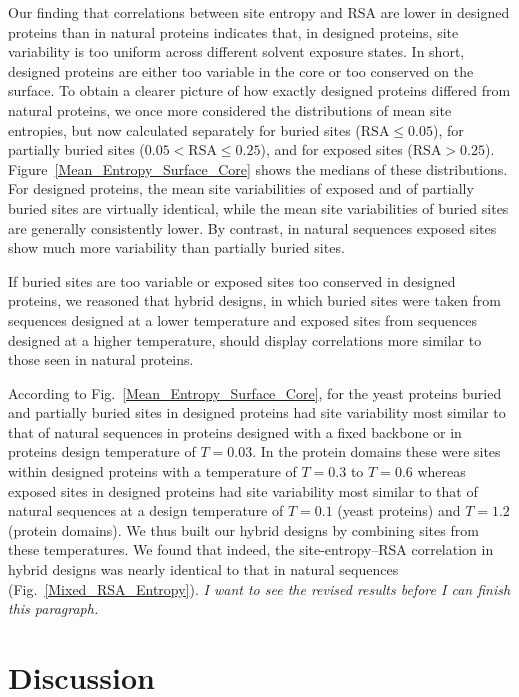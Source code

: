 \documentclass[12pt]{article}
\begin{document}
Our finding that correlations between site entropy and RSA are lower in designed proteins than in natural proteins indicates that, in designed proteins, site variability is too uniform across different solvent exposure states. In short, designed proteins are either too variable in the core or too conserved on the surface. To obtain a clearer picture of how exactly designed proteins differed from natural proteins, we once more considered the distributions of mean site entropies, but now calculated separately for buried sites ($\text{RSA}\leq0.05$), for partially buried sites ($0.05<\text{RSA}\leq0.25$), and for exposed sites ($\text{RSA}>0.25$). Figure~\ref{Mean_Entropy_Surface_Core} shows the medians of these distributions. For designed proteins, the mean site variabilities of exposed and of partially buried sites are virtually identical, while the mean site variabilities of buried sites are generally consistently lower. By contrast, in natural sequences exposed sites show much more variability than partially buried sites.

If buried sites are too variable or exposed sites too conserved in designed proteins, we reasoned that hybrid designs, in which buried sites were taken from sequences designed at a lower temperature and exposed sites from sequences designed at a higher temperature, should display correlations more similar to those seen in natural proteins. 

{\color{red} According to Fig.~\ref{Mean_Entropy_Surface_Core}, for the yeast proteins buried and partially buried sites in designed proteins had site variability most similar to that of natural sequences in proteins designed with a fixed backbone or in proteins design temperature of $T=0.03$. In the protein domains these were sites within designed proteins with a temperature of $T=0.3$ to $T = 0.6$  whereas exposed sites in designed proteins had site variability most similar to that of natural sequences at a design temperature of $T= 0.1$ (yeast proteins) and $T  = 1.2$ (protein domains).  We thus built our hybrid designs by combining sites from these temperatures. We found that indeed, the site-entropy--RSA correlation in hybrid designs was nearly identical to that in natural sequences (Fig.~\ref{Mixed_RSA_Entropy}).} {\color{blue}\emph{I want to see the revised results before I can finish this paragraph.}}

\section{Discussion}
\end{document}
